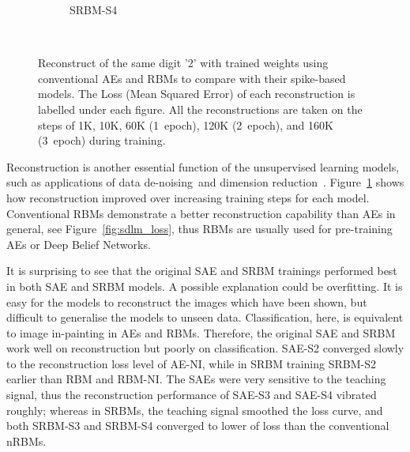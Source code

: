 \begin{figure}
\begin{subfigure}[t]{0.32\textwidth}
		\caption{SRBM-S4}
	\end{subfigure}\\
	\caption{Reconstruct of the same digit '2' with trained weights using \DIFdelbeginFL {}\DIFdelendFL conventional AEs and RBMs to compare with their spike-based models.
		The Loss (Mean Squared Error) of each reconstruction is labelled under each figure.
		All the reconstructions are taken on the steps of 1K, 10K, 60K (1~epoch), 120K (2~epoch), and 160K (3~epoch) during training.}
	\label{fig:sdlm_recon}
\end{figure}

Reconstruction is another essential function of the unsupervised learning models, such as applications of data de-noising~\DIFdelbegin {}\DIFdelend \DIFaddbegin {}\DIFaddend and dimension reduction~\DIFdelbegin {}\DIFdelend \DIFaddbegin {}\DIFaddend .
Figure~\ref{fig:sdlm_recon} shows how reconstruction improved over increasing training steps for each model.
Conventional RBMs demonstrate a better reconstruction capability than AEs in general, see Figure~\ref{fig:sdlm_loss}, thus RBMs are usually used for pre-training \DIFdelbegin {}\DIFdelend AEs or Deep Belief Networks.

It is surprising to see that the original SAE and SRBM trainings performed best in both SAE and SRBM models.
A possible explanation could be overfitting.
It is easy for the models to reconstruct the images which have been shown, but difficult to generalise the models to unseen data.
Classification, here, is equivalent to image in-painting in AEs and RBMs.
Therefore, the original SAE and SRBM work well on reconstruction but poorly on classification.
SAE-S2 converged slowly to the reconstruction loss level of AE-NI, while in SRBM training \DIFdelbegin {}\DIFdelend SRBM-S2 \DIFdelbegin {}\DIFdelend \DIFaddbegin {}\DIFaddend earlier than RBM and RBM-NI.
The SAEs were very sensitive to the teaching signal, thus the reconstruction performance of SAE-S3 and SAE-S4 vibrated roughly; 
whereas in SRBMs, the teaching signal smoothed the loss curve, and both \DIFdelbegin {}\DIFdelend SRBM-S3 and SRBM-S4 converged to lower \DIFdelbegin {}\DIFdelend \DIFaddbegin {}\DIFaddend of loss than the conventional nRBMs.


